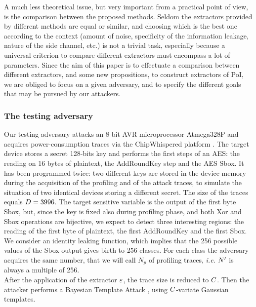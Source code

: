A much less theoretical issue, but very important from a practical point of view, is the comparison between the proposed methods. Seldom the extractors provided by different methods are equal or similar, and choosing which is the best one according to the context (amount of noise, specificity of the information leakage, nature of the side channel, etc.) is not a trivial task, especially because a universal criterion to compare different extractors must encompass a lot of parameters. 
Since the aim of this paper is to effectuate a comparison between different extractors, and some new propositions, to construct extractors of PoI, we are obliged to focus on a given adversary, and to specify the different goals that may be pursued by our attackers.




\subsubsection{The testing adversary}  Our testing adversary attacks an 8-bit AVR microprocessor Atmega328P and acquires power-consumption traces via the ChipWhispered platform \cite{o2014chipwhisperer}. The target device stores a secret 128-bits key and performs the first steps of an AES: the reading on 16 bytes of plaintext, the AddRoundKey step and the AES Sbox. It has been programmed twice: two different keys are stored in the device memory during the acquisition of the profiling and of the attack traces, to simulate the situation of two identical devices storing a different secret. The size of the traces equals $\traceLength = 3996$. The target sensitive variable is the output of the first byte Sbox, but, since the key is fixed also during profiling phase, and both Xor and Sbox operations are bijective, we expect to detect three interesting regions: the reading of the first byte of plaintext, the first AddRoundKey and the first Sbox. We consider an identity leaking function, which implies that the 256 possible values of the Sbox output gives birth to 256 classes. For each class the adversary acquires the same number, that we will call $N_p$ of profiling traces, \textit{i.e.} $\numTraces[]'$ is always a multiple of 256.\\
After the application of the extractor $\extract$, the trace size is reduced to $\newTraceLength$. Then the attacker performs a Bayesian Template Attack \cite{Chari2003}, using $\newTraceLength$-variate Gaussian templates.


